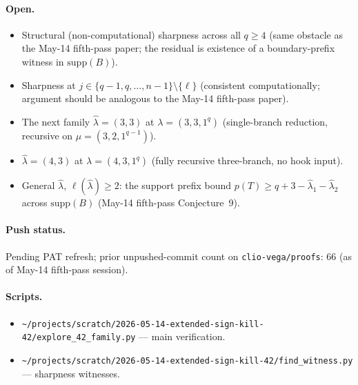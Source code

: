 \documentclass[11pt]{article}
\theoremstyle{definition}
\newcommand{\hatl}{\widehat\lambda}
\newcommand{\supp}{\mathrm{supp}}
\begin{document}
\paragraph{Open.}
\begin{itemize}[topsep=0.3em,itemsep=0.1em]
\item Structural (non-computational) sharpness across all $q \ge 4$
   (same obstacle as the May-14 fifth-pass paper; the residual is
   existence of a boundary-prefix witness in $\supp(B)$).
\item Sharpness at $j \in \{q - 1, q, \ldots, n - 1\} \setminus
   \{\ell\}$ (consistent computationally; argument should be
   analogous to the May-14 fifth-pass paper).
\item The next family $\hatl = (3, 3)$ at $\lambda = (3, 3, 1^q)$
   (single-branch reduction, recursive on $\mu = (3, 2, 1^{q-1})$).
\item $\hatl = (4, 3)$ at $\lambda = (4, 3, 1^q)$ (fully recursive
   three-branch, no hook input).
\item General $\hatl$, $\ell(\hatl) \ge 2$: the support prefix bound
   $p(T) \ge q + 3 - \hatl_1 - \hatl_2$ across $\supp(B)$
   (May-14 fifth-pass Conjecture~9).
\end{itemize}

\paragraph{Push status.}
Pending PAT refresh; prior unpushed-commit count on
\texttt{clio-vega/proofs}: $66$ (as of May-14 fifth-pass session).

\paragraph{Scripts.}
\begin{itemize}[topsep=0.3em,itemsep=0.1em]
\item \texttt{\textasciitilde/projects/scratch/2026-05-14-extended-sign-kill-42/explore\_42\_family.py}
   --- main verification.
\item \texttt{\textasciitilde/projects/scratch/2026-05-14-extended-sign-kill-42/find\_witness.py}
   --- sharpness witnesses.
\end{itemize}
\end{document}
